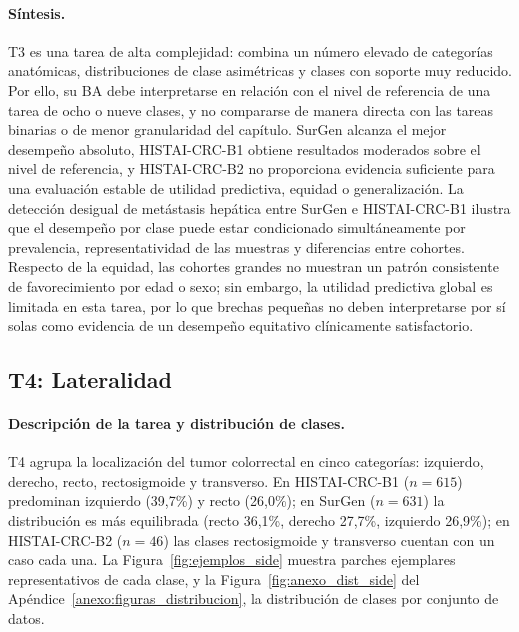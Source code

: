 \paragraph{Síntesis.} T3 es una tarea de alta complejidad: combina un número elevado de categorías anatómicas, distribuciones de clase asimétricas y clases con soporte muy reducido. Por ello, su BA debe interpretarse en relación con el nivel de referencia de una tarea de ocho o nueve clases, y no compararse de manera directa con las tareas binarias o de menor granularidad del capítulo. SurGen alcanza el mejor desempeño absoluto, HISTAI-CRC-B1 obtiene resultados moderados sobre el nivel de referencia, y HISTAI-CRC-B2 no proporciona evidencia suficiente para una evaluación estable de utilidad predictiva, equidad o generalización. La detección desigual de metástasis hepática entre SurGen e HISTAI-CRC-B1 ilustra que el desempeño por clase puede estar condicionado simultáneamente por prevalencia, representatividad de las muestras y diferencias entre cohortes. Respecto de la equidad, las cohortes grandes no muestran un patrón consistente de favorecimiento por edad o sexo; sin embargo, la utilidad predictiva global es limitada en esta tarea, por lo que brechas pequeñas no deben interpretarse por sí solas como evidencia de un desempeño equitativo clínicamente satisfactorio.

\subsection{T4: Lateralidad}
\label{sec:resultado_side}

\paragraph{Descripción de la tarea y distribución de clases.} T4 agrupa la localización del tumor colorrectal en cinco categorías: izquierdo, derecho, recto, rectosigmoide y transverso. En HISTAI-CRC-B1 ($n=615$) predominan izquierdo (39,7\%) y recto (26,0\%); en SurGen ($n=631$) la distribución es más equilibrada (recto 36,1\%, derecho 27,7\%, izquierdo 26,9\%); en HISTAI-CRC-B2 ($n=46$) las clases rectosigmoide y transverso cuentan con un caso cada una. La Figura~\ref{fig:ejemplos_side} muestra parches ejemplares representativos de cada clase, y la Figura~\ref{fig:anexo_dist_side} del Apéndice~\ref{anexo:figuras_distribucion}, la distribución de clases por conjunto de datos.

